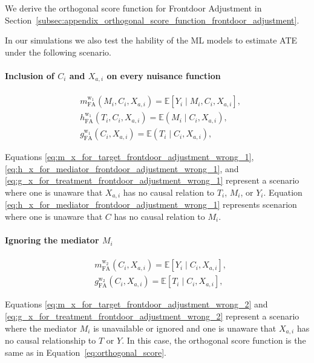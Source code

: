 \documentclass{article}
\numberwithin{equation}{section}
\begin{document}
We derive the orthogonal score function for Frontdoor Adjustment in Section~\ref{subsec:appendix_orthogonal_score_function_frontdoor_adjustment}.

In our simulations we also test the hability of the ML models to estimate ATE under the following scenario.

\paragraph{Inclusion of $C_i$ and $X_{a, i}$ on every nuisance function}

\begin{align}
    & m_{\text{FA}}^{\text{w}_1}(M_i, C_i, X_{a, i}) = \mathbb{E}[Y_i \mid M_i, C_i, X_{a, i}],
    \label{eq:m_x_for_target_frontdoor_adjustment_wrong_1} \\
    & h_{\text{FA}}^{\text{w}_1}(T_i, C_i, X_{a, i}) = \mathbb{E}(M_i \mid C_i, X_{a, i}),
    \label{eq:h_x_for_mediator_frontdoor_adjustment_wrong_1} \\
    & g_{\text{FA}}^{\text{w}_1}(C_i, X_{a, i}) = \mathbb{E}(T_i \mid C_i, X_{a, i}),
    \label{eq:g_x_for_treatment_frontdoor_adjustment_wrong_1}
\end{align}

Equations \eqref{eq:m_x_for_target_frontdoor_adjustment_wrong_1}, \eqref{eq:h_x_for_mediator_frontdoor_adjustment_wrong_1}, and \eqref{eq:g_x_for_treatment_frontdoor_adjustment_wrong_1} represent a scenario where one is unaware that $X_{a, i}$ has no causal relation to $T_i$, $M_i$, or $Y_i$. Equation \eqref{eq:h_x_for_mediator_frontdoor_adjustment_wrong_1} represents scenarion where one is unaware that $C$ has no causal relation to $M_i$.

\paragraph{Ignoring the mediator $M_i$}

\begin{align}
    & m_{\text{FA}}^{\text{w}_2}(C_i, X_{a, i}) = \mathbb{E}[Y_i \mid C_i, X_{a, i}],
    \label{eq:m_x_for_target_frontdoor_adjustment_wrong_2} \\
    & g_{\text{FA}}^{\text{w}_2}(C_i, X_{a, i}) = \mathbb{E}[T_i \mid C_i, X_{a, i}],
    \label{eq:g_x_for_treatment_frontdoor_adjustment_wrong_2}
\end{align}

Equations \eqref{eq:m_x_for_target_frontdoor_adjustment_wrong_2} and \eqref{eq:g_x_for_treatment_frontdoor_adjustment_wrong_2} represent a scenario where the mediator $M_i$ is unavailable or ignored and one is unaware that $X_{a, i}$ has no causal relationship to $T$ or $Y$. In this case, the orthogonal score function is the same as in Equation~\eqref{eq:orthogonal_score}.
\end{document}
